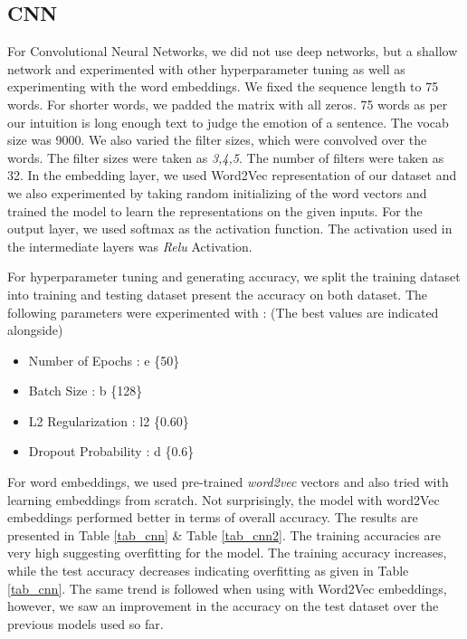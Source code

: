 \documentclass[conference]{IEEEtran}
\numberwithin{equation}{section}
\numberwithin{figure}{section}
\numberwithin{table}{section}
\begin{document}
\subsection{CNN}
For Convolutional Neural Networks, we did not use deep networks, but a shallow network and experimented with other hyperparameter tuning as well as experimenting with the word embeddings. We fixed the sequence length to 75 words. For shorter words, we padded the matrix with all zeros. 75 words as per our intuition is long enough text to judge the emotion of a sentence. The vocab size was 9000. We also varied the filter sizes, which were convolved over the words. The filter sizes were taken as \textit{3,4,5}. The number of filters were taken as 32.  In the embedding layer, we used Word2Vec representation of our dataset and we also experimented by taking random initializing of the word vectors and trained the model to learn the representations on the given inputs. For the output layer, we used softmax as the activation function. The activation used in the intermediate layers was \textit{Relu} Activation.

For hyperparameter tuning and generating accuracy, we split the training dataset into training and testing dataset present the accuracy on both dataset. The following parameters were experimented with : (The best values are indicated alongside)
\begin{itemize}
\item Number of Epochs : e  \{50\}
\item Batch Size : b    \{128\}
\item L2 Regularization : l2  \{0.60\}
\item Dropout Probability : d \{0.6\}
\end{itemize}
For word embeddings, we used pre-trained \textit{word2vec} vectors and also tried with learning embeddings from scratch. Not surprisingly, the model with word2Vec embeddings performed better in terms of overall accuracy. The results are presented in Table \ref{tab_cnn} \& Table \ref{tab_cnn2}. The training accuracies are very high suggesting overfitting for the model. The training accuracy increases, while the test accuracy decreases indicating overfitting as given in Table \ref{tab_cnn}. The same trend is followed when using with Word2Vec embeddings, however, we saw an improvement in the accuracy on the test dataset over the previous models used so far.
\end{document}
